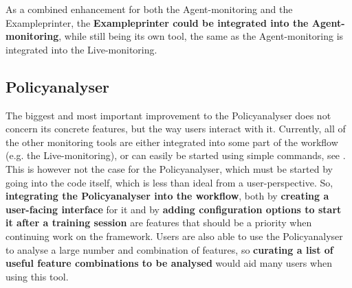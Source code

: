 As a combined enhancement for both the Agent-monitoring and the Exampleprinter, the \textbf{Exampleprinter could be integrated into the Agent-monitoring}, while still being its own tool, the same as the Agent-monitoring is integrated into the Live-monitoring.

\subsection{Policyanalyser}\label{subsec:FuturePolicyAnalyser}

The biggest and most important improvement to the Policyanalyser does not concern its concrete features, but the way users interact with it. Currently, all of the other monitoring tools are either integrated into some part of the workflow (e.g. the Live-monitoring), or can easily be started using simple commands, see . This is however not the case for the Policyanalyser, which must be started by going into the code itself, which is less than ideal from a user-perspective. So, \textbf{integrating the Policyanalyser into the workflow}, both by \textbf{creating a user-facing interface} for it and by \textbf{adding configuration options to start it after a training session} are features that should be a priority when continuing work on the framework. Users are also able to use the Policyanalyser to analyse a large number and combination of features, so \textbf{curating a list of useful feature combinations to be analysed} would aid many users when using this tool.